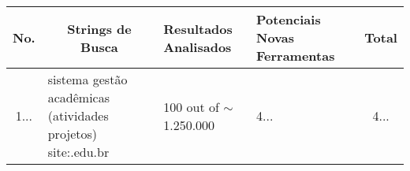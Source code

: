 \begin{table}[!htb]
  \centering
  \tiny
  \begin{tabular}{c|p{3cm}|l|p{1.5cm}|c}
    \bottomrule
    \rowcolor[rgb]{0.753,0.753,0.753} \textbf{No.} & \multicolumn{1}{c|}{\textbf{Strings de Busca}}                               & \textbf{Resultados Analisados} & \textbf{Potenciais Novas Ferramentas} & \textbf{Total} \\
    \hline
    \rowcolor[rgb]{0.898,0.898,0.898} 1...         & sistema gestão acadêmicas (atividades \textbar{} projetos) site:.edu.br      & 100 out of $\sim$1.250.000     & 4...                                  & 4...           \\

\end{tabular}
\end{table}

